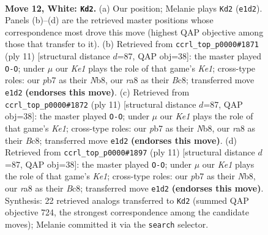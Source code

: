 \documentclass[11pt]{article}
\begin{document}
\clearpage

\begin{figure}[p]\centering
\begin{subfigure}{0.46\textwidth}\centering
\resizebox{\linewidth}{!}{%
\newchessgame
\chessboard[
  setfen={r1b2r2/ppppqppk/2n1pn2/2P4p/Q2P4/2B2NP1/PP2PP1P/R3KB1R w - - 1 12},
  showmover=false,
  pgfstyle=straightmove, color=movearrow, markmove={e1-d2}
]}
\caption{}
\end{subfigure}\hfill
\begin{subfigure}{0.46\textwidth}\centering
\resizebox{\linewidth}{!}{%
\newchessgame
\chessboard[
  setfen={rnbqk2r/pp2ppbp/2p2np1/3p4/2PP4/1QN2NP1/PP2PP1P/R1B1KB1R b KQkq - 1 6},
  showmover=false,
  pgfstyle=straightmove, color=movearrow, markmove={e8-g8}
]}
\caption{}
\end{subfigure}
\\[4pt]
\begin{subfigure}{0.46\textwidth}\centering
\resizebox{\linewidth}{!}{%
\newchessgame
\chessboard[
  setfen={rnbqk2r/pp2ppbp/2p2np1/3p4/2PP4/1QN2NP1/PP2PP1P/R1B1KB1R b KQkq - 1 6},
  showmover=false,
  pgfstyle=straightmove, color=movearrow, markmove={e8-g8}
]}
\caption{}
\end{subfigure}\hfill
\begin{subfigure}{0.46\textwidth}\centering
\resizebox{\linewidth}{!}{%
\newchessgame
\chessboard[
  setfen={rnbqk2r/pp2ppbp/2p2np1/3p4/2PP4/1QN2NP1/PP2PP1P/R1B1KB1R b KQkq - 1 6},
  showmover=false,
  pgfstyle=straightmove, color=movearrow, markmove={e8-g8}
]}
\caption{}
\end{subfigure}
\caption{\textbf{Move 12, White: \texttt{Kd2}.} (a) Our position; Melanie plays \texttt{Kd2} (\texttt{e1d2}). Panels (b)--(d) are the retrieved master positions whose correspondence most drove this move (highest QAP objective among those that transfer to it). (b) Retrieved from \texttt{ccrl\_top\_p0000\#1871} (ply 11) [structural distance $d$=87, QAP obj=38]: the master played \texttt{O-O}; under $\mu$ our \emph{Ke1} plays the role of that game's \emph{Ke1}; cross-type roles: our \emph{p}b7 as their \emph{N}b8, our \emph{r}a8 as their \emph{B}c8; transferred move \texttt{e1d2} \textbf{(endorses this move)}. (c) Retrieved from \texttt{ccrl\_top\_p0000\#1872} (ply 11) [structural distance $d$=87, QAP obj=38]: the master played \texttt{O-O}; under $\mu$ our \emph{Ke1} plays the role of that game's \emph{Ke1}; cross-type roles: our \emph{p}b7 as their \emph{N}b8, our \emph{r}a8 as their \emph{B}c8; transferred move \texttt{e1d2} \textbf{(endorses this move)}. (d) Retrieved from \texttt{ccrl\_top\_p0000\#1897} (ply 11) [structural distance $d$=87, QAP obj=38]: the master played \texttt{O-O}; under $\mu$ our \emph{Ke1} plays the role of that game's \emph{Ke1}; cross-type roles: our \emph{p}b7 as their \emph{N}b8, our \emph{r}a8 as their \emph{B}c8; transferred move \texttt{e1d2} \textbf{(endorses this move)}. Synthesis: 22 retrieved analogs transferred to \texttt{Kd2} (summed QAP objective 724, the strongest correspondence among the candidate moves); Melanie committed it via the \texttt{search} selector.}
\label{fig:thought-m22}
\end{figure}
\end{document}
